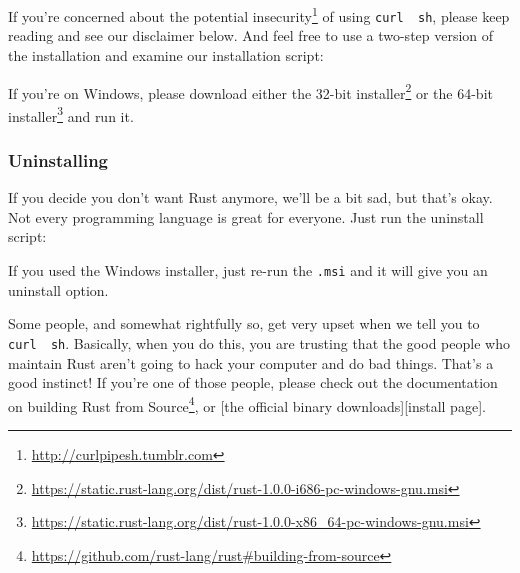 \documentclass[a4paper,]{book}
\newenvironment{Shaded}{\begin{snugshade}}{\end{snugshade}}
\newcommand{\KeywordTok}[1]{\textcolor[rgb]{0.13,0.29,0.53}{\textbf{{#1}}}}
\newcommand{\NormalTok}[1]{{#1}}
\renewcommand{\href}[2]{#2\footnote{\url{#1}}}
\begin{document}
\begin{Shaded}
\end{Shaded}

If you're concerned about the
\href{http://curlpipesh.tumblr.com}{potential insecurity} of using
\texttt{curl\ \textbar{}\ sh}, please keep reading and see our
disclaimer below. And feel free to use a two-step version of the
installation and examine our installation script:

\begin{Shaded}
\end{Shaded}

If you're on Windows, please download either the
\href{https://static.rust-lang.org/dist/rust-1.0.0-i686-pc-windows-gnu.msi}{32-bit
installer} or the
\href{https://static.rust-lang.org/dist/rust-1.0.0-x86_64-pc-windows-gnu.msi}{64-bit
installer} and run it.

\subsubsection{Uninstalling}\label{uninstalling}

If you decide you don't want Rust anymore, we'll be a bit sad, but
that's okay. Not every programming language is great for everyone. Just
run the uninstall script:

\begin{Shaded}
\end{Shaded}

If you used the Windows installer, just re-run the \texttt{.msi} and it
will give you an uninstall option.

Some people, and somewhat rightfully so, get very upset when we tell you
to \texttt{curl\ \textbar{}\ sh}. Basically, when you do this, you are
trusting that the good people who maintain Rust aren't going to hack
your computer and do bad things. That's a good instinct! If you're one
of those people, please check out the documentation on
\href{https://github.com/rust-lang/rust\#building-from-source}{building
Rust from Source}, or {[}the official binary downloads{]}{[}install
page{]}.
\end{document}
